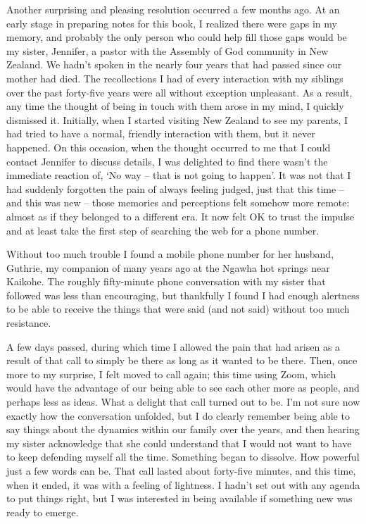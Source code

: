 Another surprising and pleasing resolution occurred a few months ago. At
an early stage in preparing notes for this book, I realized there were
gaps in my memory, and probably the only person who could help fill
those gaps would be my sister, Jennifer, a pastor with the Assembly of
God community in New Zealand. We hadn't spoken in the nearly four years
that had passed since our mother had died. The recollections I had of
every interaction with my siblings over the past forty-five years were
all without exception unpleasant. As a result, any time the thought of
being in touch with them arose in my mind, I quickly dismissed it.
Initially, when I started visiting New Zealand to see my parents, I had
tried to have a normal, friendly interaction with them, but it never
happened. On this occasion, when the thought occurred to me that I could
contact Jennifer to discuss details, I was delighted to find there
wasn't the immediate reaction of, `No way -- that is not going to
happen'. It was not that I had suddenly forgotten the pain of always
feeling judged, just that this time -- and this was new -- those
memories and perceptions felt somehow more remote: almost as if they
belonged to a different era. It now felt OK to trust the impulse and at
least take the first step of searching the web for a phone number.

Without too much trouble I found a mobile phone number for her husband,
Guthrie, my companion of many years ago at the Ngawha hot springs near
Kaikohe. The roughly fifty-minute phone conversation with my sister that
followed was less than encouraging, but thankfully I found I had enough
alertness to be able to receive the things that were said (and not said)
without too much resistance.

A few days passed, during which time I allowed the pain that had arisen
as a result of that call to simply be there as long as it wanted to be
there. Then, once more to my surprise, I felt moved to call again; this
time using Zoom, which would have the advantage of our being able to see
each other more as people, and perhaps less as ideas. What a delight
that call turned out to be. I'm not sure now exactly how the
conversation unfolded, but I do clearly remember being able to say
things about the dynamics within our family over the years, and then
hearing my sister acknowledge that she could understand that I would not
want to have to keep defending myself all the time. Something began to
dissolve. How powerful just a few words can be. That call lasted about
forty-five minutes, and this time, when it ended, it was with a feeling
of lightness. I hadn't set out with any agenda to put things right, but
I was interested in being available if something new was ready to
emerge.

